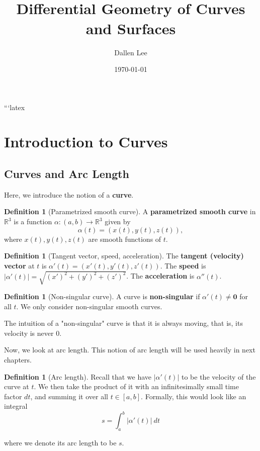 \documentclass[10pt, a4paper]{article}
\title{\textbf{\coursename \\ Differential Geometry of Curves and Surfaces}} %
\author{Dallen Lee}
\date{\today}
\theoremstyle{plain}
\theoremstyle{definition}
\newtheorem{definition}[theorem]{Definition}
\theoremstyle{remark}
\newenvironment{sidenote}{%
  \par\vspace{0.5em}%
  \noindent\color{defcolor}%
}{%
  \par\vspace{0.5em}%
  \color{black}%
}
\begin{document}

\maketitle
\thispagestyle{empty}
\tableofcontents
\newpage



```latex
\section{Introduction to Curves}

\subsection{Curves and Arc Length}

Here, we introduce the notion of a \textbf{curve}.
\begin{definition}[Parametrized smooth curve]
  A \textbf{parametrized smooth curve} in $\mathbb{R}^3$ is a function $\alpha:(a,b)\to\mathbb{R}^3$ given by
  \[
    \alpha(t)=(x(t),y(t),z(t)),
  \]
  where $x(t),y(t),z(t)$ are smooth functions of $t$.
\end{definition}

\begin{definition}[Tangent vector, speed, acceleration]
  The \textbf{tangent (velocity) vector} at $t$ is $\alpha'(t)=(x'(t),y'(t),z'(t))$.
  The \textbf{speed} is $|\alpha'(t)|=\sqrt{(x')^2+(y')^2+(z')^2}$.
  The \textbf{acceleration} is $\alpha''(t)$.
\end{definition}

\begin{definition}[Non-singular curve]
  A curve is \textbf{non-singular} if $\alpha'(t)\neq\mathbf{0}$ for all $t$. We only consider non-singular smooth curves.
\end{definition}

\begin{sidenote}
    The intuition of a "non-singular" curve is that it is always moving, that is, its velocity is never $0$.
\end{sidenote}

Now, we look at arc length. This notion of arc length will be used heavily in next chapters.

\begin{definition}[Arc length]
Recall that we have $|\alpha'(t)|$ to be the velocity of the curve at $t$. We then take the product of it with an infinitesimally small time factor $dt$, and summing it over all $t \in [a,b]$. Formally, this would look like an integral
$$s=\int_{a}^b |\alpha'(t)|\ dt$$

where we denote its arc length to be $s$.
    
\end{definition}
\end{document}
